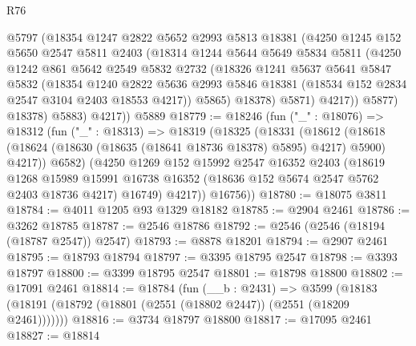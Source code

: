 \begin{lexlean}{R76}
\begin{coremodule}
              @5797
              (@18354
                @1247
                @2822
                @5652
                @2993
                @5813
                @18381
                (@4250
                  @1245
                  @152
                  @5650
                  @2547
                  @5811
                  @2403
                  (@18314
                    @1244
                    @5644
                    @5649
                    @5834
                    @5811
                    (@4250
                      @1242
                      @861
                      @5642
                      @2549
                      @5832
                      @2732
                      (@18326
                        @1241
                        @5637
                        @5641
                        @5847
                        @5832
                        (@18354
                          @1240
                          @2822
                          @5636
                          @2993
                          @5846
                          @18381
                          (@18534 @152 @2834 @2547 @3104 @2403 @18553 @4217))
                        @5865)
                      @18378)
                    @5871)
                  @4217))
              @5877)
            @18378)
          @5883)
        @4217))
    @5889
@18779 := @18246
    (fun ("_" : @18076) =>
    @18312
      (fun ("_" : @18313) =>
      @18319
        (@18325
          (@18331
            (@18612
              (@18618 (@18624 (@18630 (@18635 (@18641 @18736 @18378) @5895) @4217) @5900) @4217))
            @6582)
          (@4250
            @1269
            @152
            @15992
            @2547
            @16352
            @2403
            (@18619
              @1268
              @15989
              @15991
              @16738
              @16352
              (@18636 @152 @5674 @2547 @5762 @2403 @18736 @4217)
              @16749)
            @4217))
        @16756))
@18780 := @18075 @3811
@18784 := @4011 @1205 @93 @1329 @18182
@18785 := @2904 @2461
@18786 := @3262 @18785
@18787 := @2546 @18786
@18792 := @2546 (@2546 (@18194 (@18787 @2547)) @2547)
@18793 := @8878 @18201
@18794 := @2907 @2461
@18795 := @18793 @18794
@18797 := @3395 @18795 @2547
@18798 := @3393 @18797
@18800 := @3399 @18795 @2547
@18801 := @18798 @18800
@18802 := @17091 @2461
@18814 := @18784
    (fun (__b : @2431) =>
    @3599 (@18183 (@18191 (@18792 (@18801 (@2551 (@18802 @2447)) (@2551 (@18209 @2461)))))))
@18816 := @3734 @18797 @18800
@18817 := @17095 @2461
@18827 := @18814

\end{coremodule}
\end{lexlean}
